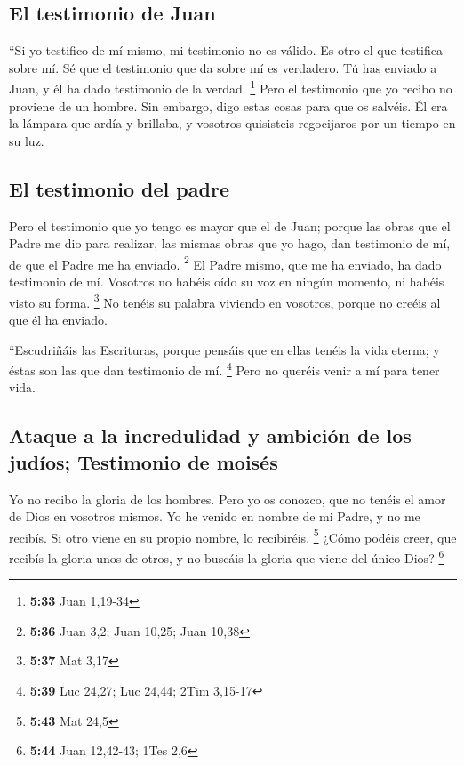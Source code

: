 \begin{paracol}{2}
\hypertarget{el-testimonio-de-juan}{%
\subsection{El testimonio de Juan}\label{el-testimonio-de-juan}}

 ``Si yo testifico de mí mismo, mi testimonio no es
válido.  Es otro el que testifica sobre mí. Sé que el
testimonio que da sobre mí es verdadero.  Tú has enviado
a Juan, y él ha dado testimonio de la verdad. \footnote{\textbf{5:33}
  Juan 1,19-34}  Pero el testimonio que yo recibo no
proviene de un hombre. Sin embargo, digo estas cosas para que os
salvéis.  Él era la lámpara que ardía y brillaba, y
vosotros quisisteis regocijaros por un tiempo en su luz.

\hypertarget{el-testimonio-del-padre}{%
\subsection{El testimonio del padre}\label{el-testimonio-del-padre}}

 Pero el testimonio que yo tengo es mayor que el de Juan;
porque las obras que el Padre me dio para realizar, las mismas obras que
yo hago, dan testimonio de mí, de que el Padre me ha enviado.
\footnote{\textbf{5:36} Juan 3,2; Juan 10,25; Juan 10,38}
 El Padre mismo, que me ha enviado, ha dado testimonio de
mí. Vosotros no habéis oído su voz en ningún momento, ni habéis visto su
forma. \footnote{\textbf{5:37} Mat 3,17}  No tenéis su
palabra viviendo en vosotros, porque no creéis al que él ha enviado.

 ``Escudriñáis las Escrituras, porque pensáis que en
ellas tenéis la vida eterna; y éstas son las que dan testimonio de mí.
\footnote{\textbf{5:39} Luc 24,27; Luc 24,44; 2Tim 3,15-17}
 Pero no queréis venir a mí para tener vida.

\hypertarget{ataque-a-la-incredulidad-y-ambiciuxf3n-de-los-juduxedos-testimonio-de-moisuxe9s}{%
\subsection{Ataque a la incredulidad y ambición de los judíos;
Testimonio de
moisés}\label{ataque-a-la-incredulidad-y-ambiciuxf3n-de-los-juduxedos-testimonio-de-moisuxe9s}}

 Yo no recibo la gloria de los hombres. 
Pero yo os conozco, que no tenéis el amor de Dios en vosotros mismos.
 Yo he venido en nombre de mi Padre, y no me recibís. Si
otro viene en su propio nombre, lo recibiréis. \footnote{\textbf{5:43}
  Mat 24,5}  ¿Cómo podéis creer, que recibís la gloria
unos de otros, y no buscáis la gloria que viene del único Dios?
\footnote{\textbf{5:44} Juan 12,42-43; 1Tes 2,6}


\end{paracol}
